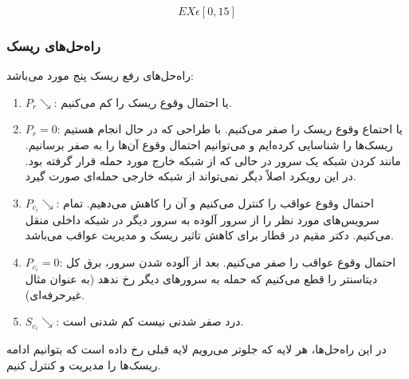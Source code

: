 \begin{equation}
    EX \epsilon [0, 15]
\end{equation}

\subsubsection{راه‌حل‌های ریسک}

راه‌حل‌های رفع ریسک پنج مورد می‌باشد:

\begin{enumerate}
    \item $P_{r} \searrow$: یا احتمال وقوع ریسک را کم می‌کنیم.
    \item $P_{r} = 0$: یا احتماع وقوع ریسک را صفر می‌کنیم. با طراحی که در حال
    انجام هستیم ریسک‌ها را شناسایی کرده‌ایم و می‌توانیم احتمال وقوع آن‌ها را به
    صفر برسانیم. مانند  کردن شبکه یک سرور در حالی که از شبکه
    خارج مورد حمله قرار گرفته بود. در این رویکرد اصلاً دیگر نمی‌تواند از شبکه
    خارجی حمله‌ای صورت گیرد.
    \item $P_{c_{i}} \searrow$: احتمال وقوع عواقب را کنترل می‌کنیم و آن را کاهش
    می‌دهیم. تمام سرویس‌های مورد نظر را از سرور آلوده به سرور دیگر در شبکه داخلی
    منقل می‌کنیم. دکتر مقیم در قطار برای کاهش تاثیر ریسک و مدیریت عواقب می‌باشد.
    \item $P_{c_{i}} = 0$: احتمال وقوع عواقب را صفر می‌کنیم. بعد از آلوده شدن
    سرور، برق کل دیتاسنتر را قطع می‌کنیم که حمله به سرور‌های دیگر رخ ندهد (به
    عنوان مثال غیرحرفه‌ای).
    \item $S_{c_{i}} \searrow$: درد صفر شدنی نیست کم شدنی است.
\end{enumerate}

در این راه‌حل‌ها، هر لایه که جلوتر می‌رویم لایه قبلی رخ داده است که بتوانیم
ادامه ریسک‌ها را مدیریت و کنترل کنیم.

